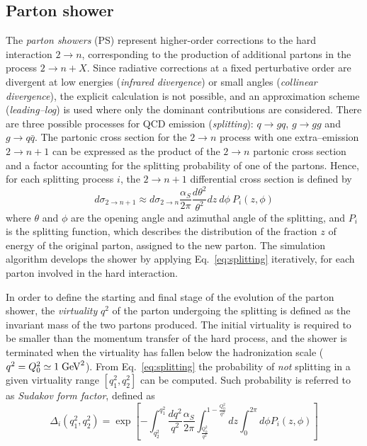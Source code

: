 \subsection{Parton shower}
\label{sec:partonshower}

The {\it parton showers} (PS) represent higher-order corrections to the hard
interaction $2\to n$, corresponding to the production of additional
partons in the process $2\to n+X$.
Since radiative corrections at a fixed perturbative order are
divergent at low energies ({\it infrared divergence}) or small angles
({\it collinear divergence}), the explicit calculation is not possible,
and an approximation scheme ({\it leading--log}) is used where only
the dominant contributions are considered.
There are three possible processes for QCD emission ({\it splitting}): 
$q\to gq$, $g\to gg$ and $g\to q\bar{q}$.
The partonic cross section for the $2\to n$ process with one
extra--emission $2\to n+1$ can be expressed as the product of the
$2\to n$ partonic cross section and a factor accounting for the
splitting probability of one of the partons. 
Hence, for each splitting process $i$, the $2\to n+1$ differential
cross section is defined by
\begin{equation}
  d\sigma_{2\to n+1}\approx{} d\sigma_{2\to n}
  \frac{\alpha_S}{2\pi}\frac{d\theta^2}{\theta^2} dz~d\phi~P_i(z,\phi) 
 \label{eq:splitting}
\end{equation}
where $\theta$ and $\phi$ are the opening angle and azimuthal angle of
the splitting, and $P_i$ is the splitting function, which describes
the distribution of the fraction $z$ of energy of the original parton,
assigned to the new parton.
The simulation algorithm develops the shower by applying
Eq.~\ref{eq:splitting} iteratively, for each parton involved in the
hard interaction.

In order to define the starting and final stage of the evolution of
the parton shower, the {\it virtuality} $q^2$ of the parton undergoing
the splitting is defined as the invariant mass of the two partons
produced. The initial virtuality is required to be smaller than the
momentum transfer of the hard process, and the shower is terminated
when the virtuality has fallen below the hadronization scale
($q^2=Q_0^2\simeq1\; \mathrm{GeV}^2$).
From Eq.~\ref{eq:splitting} the probability of {\it not} splitting in
a given virtuality range $[q_1^2,q_2^2]$ can be computed. Such
probability is referred to as {\it Sudakov form factor}, defined as
\begin{equation}
  \label{eq:sudakov} 
  \Delta_i (q_1^2, q_2^2) = \exp \left[ - \int_{q_2^2}^{q_1^2}
    \frac{dq^2}{q^2} \frac{\alpha_S}{2\pi}
    \int_{\frac{Q_0^2}{q^2}}^{1-\frac{Q_0^2}{q^2}} dz \int_0^{2\pi} d\phi{} P_{i} (z,\phi) \right]
  \end{equation}

